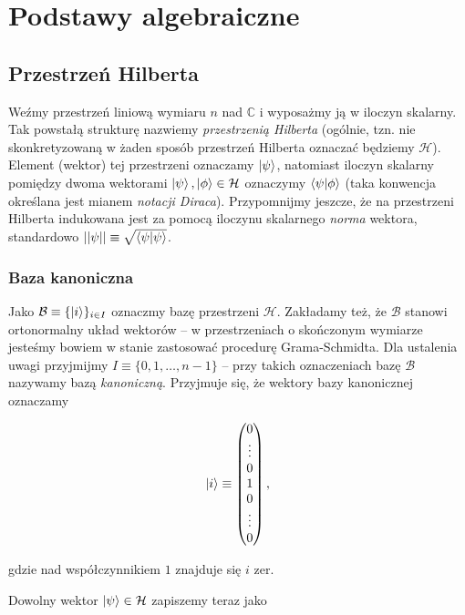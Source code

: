 \section{Podstawy algebraiczne}

\subsection{Przestrzeń Hilberta}

Weźmy przestrzeń liniową wymiaru $n$ nad $\mathbb{C}$ i wyposażmy ją w iloczyn skalarny. Tak powstałą strukturę nazwiemy \textit{przestrzenią Hilberta} (ogólnie, tzn. nie skonkretyzowaną w żaden sposób przestrzeń Hilberta oznaczać będziemy $\mathcal{H}$). Element (wektor) tej przestrzeni oznaczamy $\ket{\psi}$, natomiast iloczyn skalarny pomiędzy dwoma wektorami $\ket{\psi}, \ket{\phi} \in \mathcal{H}$ oznaczymy $\bra{\psi}\ket{\phi}$ (taka konwencja określana jest mianem \textit{notacji Diraca}). Przypomnijmy jeszcze, że na przestrzeni Hilberta indukowana jest za pomocą iloczynu skalarnego \textit{norma} wektora, standardowo $||\psi|| \equiv \sqrt{\bra{\psi}\ket{\psi}}$.

\subsubsection{Baza kanoniczna}

Jako $\mathcal{B} \equiv \{\ket{i}\}_{i\in I}$ oznaczmy bazę przestrzeni $\mathcal{H}$. Zakładamy też, że $\mathcal{B}$ stanowi ortonormalny układ wektorów -- w przestrzeniach o skończonym wymiarze jesteśmy bowiem w stanie zastosować procedurę Grama-Schmidta. Dla ustalenia uwagi przyjmijmy $I \equiv \{0,1, \ldots , n - 1 \}$ -- przy takich oznaczeniach bazę $\mathcal{B}$ nazywamy bazą \textit{kanoniczną}. Przyjmuje się, że wektory bazy kanonicznej oznaczamy

$$
    \ket{i} \equiv
    \begin{pmatrix}
        0 \\
        \vdots \\
        0 \\
        1 \\
        0 \\
        \vdots \\
        0
    \end{pmatrix},
$$

gdzie nad współczynnikiem $1$ znajduje się $i$ zer.

Dowolny wektor $\ket{\psi} \in \mathcal{H}$ zapiszemy teraz jako

